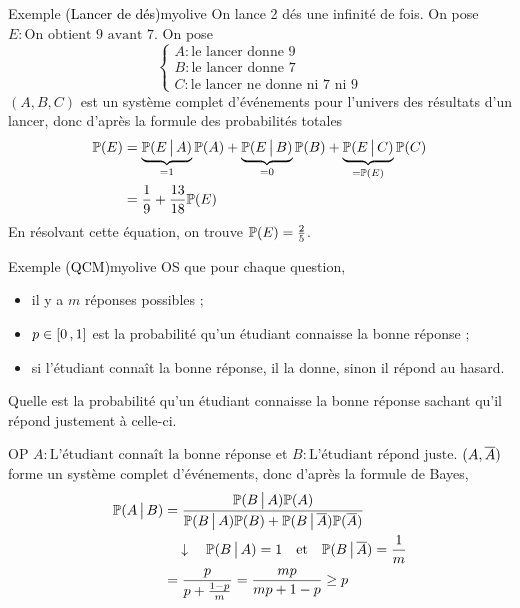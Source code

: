     \begin{omed}{Exemple \textcolor{black}{(Lancer de dés)}}{myolive}
        On lance 2 dés une infinité de fois. On pose $E : \text{On obtient 9 avant 7}$. On pose 
        \[ \left\{ \begin{array}{l}
            A : \text{le lancer donne 9} \\
            B : \text{le lancer donne 7} \\
            C : \text{le lancer ne donne ni 7 ni 9}
        \end{array} \right. \]
        $(A, B, C)$ est un système complet d’événements pour l’univers des résultats d’un lancer, donc d’après la formule des probabilités totales 
        \begin{align*}
            \P(E) 
            &= \underbrace{\P(E \vbar A)}_{= 1} \P(A) + \underbrace{\P(E \vbar B)}_{= 0} \P(B) + \underbrace{\P(E \vbar C)}_{= \P(E)} \P(C) \\
            &= \frac{1}{9} + \frac{13}{18} \P(E) 
        \end{align*}
        En résolvant cette équation, on trouve $\P(E) = \frac{2}{5}$.
    \end{omed}

    \begin{omed}{Exemple \textcolor{black}{(QCM)}}{myolive}
        OS que pour chaque question, \begin{itemize}
            \item il y a $m$ réponses possibles ;
            \item $p \in \intervalleFF{0}{1}$ est la probabilité qu’un étudiant connaisse la bonne réponse ;
            \item si l’étudiant connaît la bonne réponse, il la donne, sinon il répond au hasard.
        \end{itemize}
        Quelle est la probabilité qu’un étudiant connaisse la bonne réponse sachant qu’il répond justement à celle-ci.

        OP $A : \text{L’étudiant connaît la bonne réponse}$ et $B : \text{L’étudiant répond juste}$. $(A, \ovl{A})$ forme un système complet d’événements, donc d’après la formule de Bayes, 
        \begin{align*}
            \P(A \vbar B) 
            &= \frac{\P(B \vbar A) \P(A)}{\P(B \vbar A) \P(B) + \P(B \vbar \ovl{A}) \P(\ovl{A})} \\
            &\argu \P(B \vbar A) = 1 \esp{et} \P(B \vbar \ovl{A}) = \frac{1}{m} \\
            &= \frac{p}{p + \frac{1 - p}{m}} = \frac{mp}{mp + 1 - p} \geq p \\
        \end{align*}
    \end{omed}

